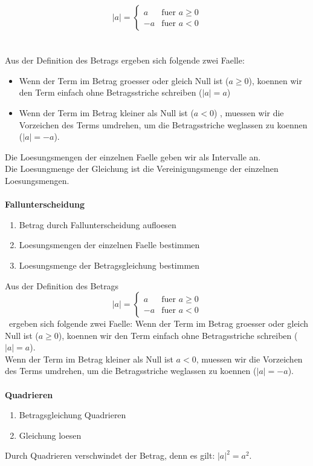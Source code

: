 \begin{multicols}{2}
    \begin{equation*} |a| = \begin{cases} a &\text{fuer } a \geq 0 \\[5px] -a &\text{fuer } a < 0 \end{cases} \end{equation*}\\~\\
    Aus der Definition des Betrags ergeben sich folgende zwei Faelle: \\
    \begin{itemize}
        \item Wenn der Term im Betrag groesser oder gleich Null ist ($a \geq 0$), koennen wir den Term einfach ohne Betragsstriche schreiben ($|a| = a$)
        \item Wenn der Term im Betrag kleiner als Null ist ($a < 0$) , muessen wir die Vorzeichen des Terms umdrehen, um die Betragsstriche weglassen zu koennen ($|a| = -a$).
    \end{itemize}
    Die Loesungsmengen der einzelnen Faelle geben wir als Intervalle an. \\
    Die Loesungmenge der Gleichung ist die Vereinigungsmenge der einzelnen Loesungsmengen.\\~\\
    \textbf{Fallunterscheidung}
    \begin{enumerate}
        \item Betrag durch Fallunterscheidung aufloesen
        \item Loesungsmengen der einzelnen Faelle bestimmen
        \item Loesungsmenge der Betragsgleichung bestimmen
    \end{enumerate}
    Aus der Definition des Betrags
    \begin{equation*} |a| = \begin{cases} a &\text{fuer } a \geq 0 \\[5px] -a &\text{fuer } a < 0 \end{cases} \end{equation*}\
    ergeben sich folgende zwei Faelle:
    Wenn der Term im Betrag groesser oder gleich Null ist ($a \geq 0$), koennen wir den Term einfach ohne Betragsstriche schreiben ($|a| = a$). \\
    Wenn der Term im Betrag kleiner als Null ist $a < 0$, muessen wir die Vorzeichen des Terms umdrehen, um die Betragsstriche weglassen zu koennen ($|a| = -a$).\\~\\
    \textbf{Quadrieren}
    \begin{enumerate}
        \item Betragsgleichung Quadrieren
        \item Gleichung loesen
    \end{enumerate}
    Durch Quadrieren verschwindet der Betrag, denn es gilt: $|a|^2 = a^2$.



\end{multicols}
